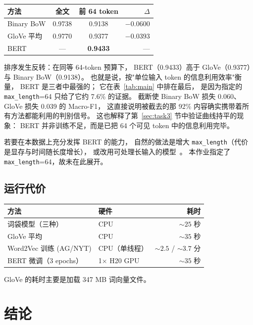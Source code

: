 \documentclass[10pt,twocolumn,letterpaper]{article}
\begin{document}
\begin{center}\small
\begin{tabular}{lccr}
\toprule
方法 & 全文 & 前 64 token & $\Delta$ \\
\midrule
Binary BoW & 0.9738 & 0.9138 & $-0.0600$ \\
GloVe 平均 & 0.9770 & 0.9377 & $-0.0393$ \\
BERT       & ---    & \textbf{0.9433} & --- \\
\bottomrule
\end{tabular}
\end{center}

排序发生反转：在同等 64-token 预算下，
BERT（0.9433）高于 GloVe（0.9377）与 Binary BoW（0.9138）。
也就是说，按"单位输入 token 的信息利用效率"衡量，
BERT 是三者中最强的；
它在表~\ref{tab:main} 中排在最后，
是因为指定的 \texttt{max\_length}=64 只给了它约 7.6\% 的证据。
截断使 Binary BoW 损失 0.060、GloVe 损失 0.039 的 Macro-F1，
这直接说明被截去的那 92\% 内容确实携带着所有方法都能利用的判别信号。
这也解释了第~\ref{sec:task3} 节中验证曲线持平的现象：
BERT 并非训练不足，而是已把 64 个可见 token 中的信息利用完毕。

若要在本数据上充分发挥 BERT 的能力，
自然的做法是增大 \texttt{max\_length}（代价是显存与时间随长度增长），
或改用可处理长输入的模型~\cite{beltagy2020longformer}。
本作业指定了 \texttt{max\_length}=64，故未在此展开。

\subsection{运行代价}

\begin{center}\small
\begin{tabular}{llr}
\toprule
方法 & 硬件 & 耗时 \\
\midrule
词袋模型（三种）        & CPU & ${\sim}25$ 秒 \\
GloVe 平均              & CPU & ${\sim}35$ 秒 \\
Word2Vec 训练 (AG/NYT)  & CPU（单线程） & ${\sim}2.5$ / ${\sim}3.7$ 分 \\
BERT 微调（3 epochs）   & 1$\times$ H20 GPU & ${\sim}35$ 秒 \\
\bottomrule
\end{tabular}
\end{center}

GloVe 的耗时主要是加载 347 MB 词向量文件。

\section{结论}
\label{sec:conclusion}
\end{document}
